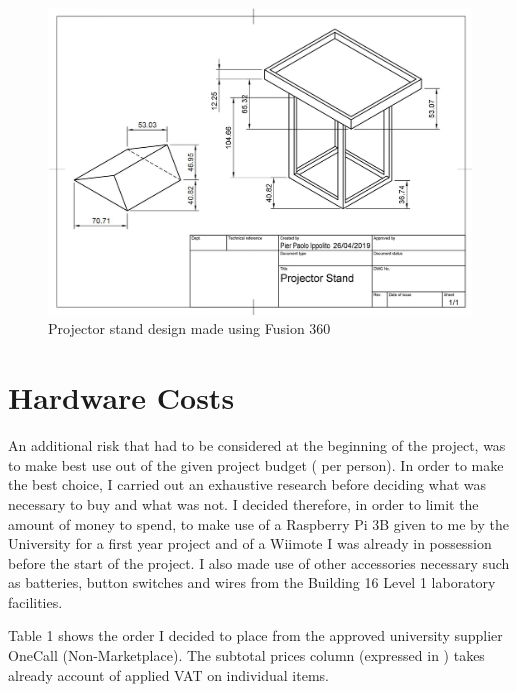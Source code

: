 \begin{appendices}
\begin{figure}%
    \centering
    \includegraphics[width=15.3cm]{images/3d.jpg}%
    \caption{Projector stand design made using Fusion 360}%
\end{figure}

\clearpage


\clearpage
\section{Hardware Costs}

An additional risk that had to be considered at the beginning of the project, was to make best use out of the given project budget ( per person). In order to make the best choice, I carried out an exhaustive research before deciding what was necessary to buy and what was not. I decided therefore, in order to limit the amount of money to spend, to make use of a Raspberry Pi 3B given to me by the University for a first year project and of a Wiimote I was already in possession before the start of the project. I also made use of other accessories necessary such as batteries, button switches and wires from the Building 16 Level 1 laboratory facilities. 

Table 1 shows the order I decided to place from the approved university supplier OneCall (Non-Marketplace). The subtotal prices column (expressed in \textsterling) takes already account of applied VAT on individual items.  


\end{appendices}
